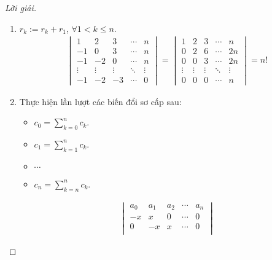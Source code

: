 \documentclass[class=linearalgebra,crop=false]{standalone}
\begin{document}
\begin{proof}[Lời giải]
    \begin{enumerate}[label = (\alph*)]
        \item $r_{k} := r_{k} + r_{1}$, $\forall 1 < k\le n$.
            \begin{align*}
                \begin{vmatrix}
                    1  & 2  & 3 & \cdots & n \\
                    -1 & 0  & 3 & \cdots & n \\
                    -1 & -2 & 0 & \cdots & n \\
                    \vdots & \vdots & \vdots & \ddots & \vdots \\
                    -1 & -2 & -3 & \cdots & 0
                \end{vmatrix}
                =
                \begin{vmatrix}
                    1 & 2 & 3 & \cdots & n \\
                    0 & 2 & 6 & \cdots & 2n \\
                    0 & 0 & 3 & \cdots & 2n \\
                    \vdots & \vdots & \vdots & \ddots & \vdots \\
                    0 & 0 & 0 & \cdots & n
                \end{vmatrix}
                = n!
            \end{align*}
        \item Thực hiện lần lượt các biến đổi sơ cấp sau:
            \begin{itemize}
                \item $c_{0} = \displaystyle\sum^{n}_{k=0}c_{k}$.
                \item $c_{1} = \displaystyle\sum^{n}_{k=1}c_{k}$.
                \item $\cdots$
                \item $c_{n} = \displaystyle\sum^{n}_{k=n}c_{k}$.
            \end{itemize}
            \begingroup
            \allowdisplaybreaks{}
            \begin{align*}
                \begin{vmatrix}
                    a_{0}  & a_{1}  & a_{2}  & \cdots & a_{n}  \\
                    -x     & x      & 0      & \cdots & 0      \\
                    0      & -x     & x      & \cdots & 0      \\

\end{vmatrix}
\end{align*}
\end{enumerate}
\end{proof}
\end{document}
